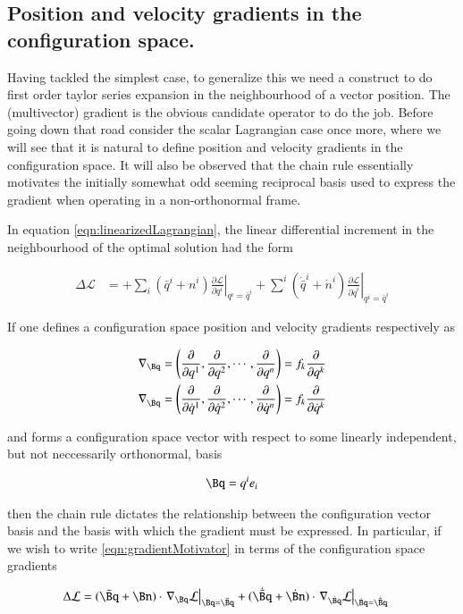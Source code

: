 \documentclass{article}
\newcommand{\LL}[0]{\mathcal{L}}
\newcommand{\qdot}[0]{\dot{q}}
\newcommand{\ndot}[0]{\dot{n}}
\newcommand{\qbar}[0]{\bar{q}}
\newcommand{\qdotbar}[0]{\dot{\bar{q}}}
\newcommand{\PD}[2]{\frac{\partial {#2}}{\partial {#1}}}
\newcommand{\grad}[0]{\nabla}
\begin{document}
\subsection{ Position and velocity gradients in the configuration space. }

Having tackled the simplest case, to generalize this we need a construct to do first order taylor series expansion in the neighbourhood of a vector
position.  The (multivector) gradient is the obvious candidate operator to do the job.
Before going down that road consider the scalar Lagrangian case once more, where we will see that it is natural to define position and velocity gradients
in the configuration space.  It will also be observed that the chain rule essentially motivates the initially somewhat odd seeming reciprocal basis
used to express the gradient when operating in a non-orthonormal frame.

In equation \ref{eqn:linearizedLagrangian}, the linear differential increment in the neighbourhood of the optimal solution had the form

\begin{align}\label{eqn:gradientMotivator}
\Delta \LL &=
+ \sum_i (\qbar^i + n^i) \left. \PD{q^i}{\LL} \right\vert_{q^i = \qbar^i}
+ \sum^i (\qdotbar^i + \ndot^i) \left. \PD{\qdot^i}{\LL} \right\vert_{q^i = \qbar^i}
\end{align}

If one defines a configuration space position and velocity gradients respectively as

\begin{align*}
\grad_{\Bq} &= \left(\PD{q^1}{}, \PD{q^2}{}, \cdots, \PD{q^n}{}\right) = f_k \PD{q^k}{} \\
\grad_{\dot{\Bq}} &= \left(\PD{\qdot^1}{}, \PD{\qdot^2}{}, \cdots, \PD{\qdot^n}{}\right) = f_k \PD{\qdot^k}{}
\end{align*}

and forms a configuration space vector with respect to some linearly independent, but not neccessarily orthonormal, basis

\begin{align*}
\Bq = q^i e_i
\end{align*}

then the chain rule dictates the relationship between the configuration vector basis and the basis with which the gradient must be expressed.  In
particular, if we wish to write \ref{eqn:gradientMotivator} in terms of the configuration space gradients

\begin{align*}
\Delta \LL &=
(\bar{\Bq} + \Bn) \cdot \left.\grad_\Bq \LL \right\vert_{\Bq = \bar{\Bq}}
+ (\dot{\bar{\Bq}} + \dot{\Bn}) \cdot \left.\grad_{\dot{\Bq}} \LL \right\vert_{\dot{\Bq} = \dot{\bar{\Bq}}}
\end{align*}
\end{document}
